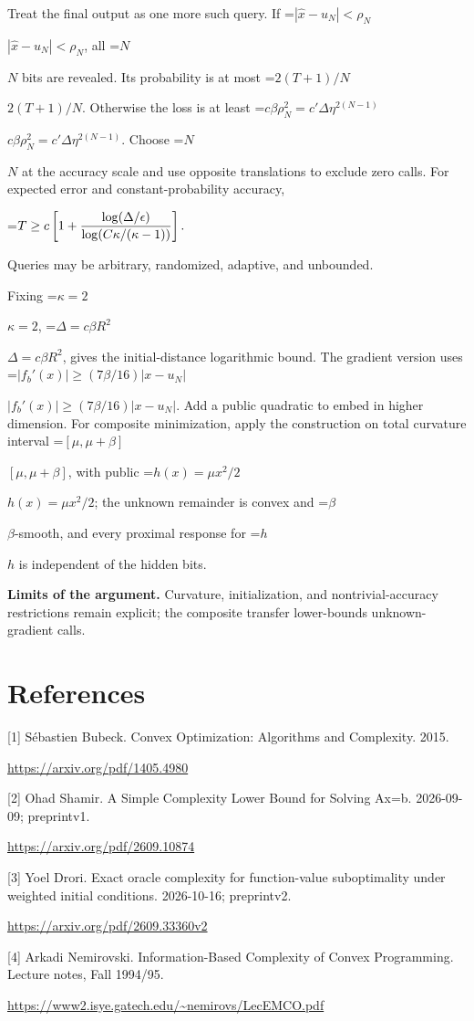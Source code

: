 \documentclass[10pt,a4paper]{article}
\newcommand{\AtlasMath}[1]{\par\begingroup\centering\setbox0=\hbox{$\displaystyle #1$}\ifdim\wd0>1.4\linewidth\typeout{ATLAS WIDE FORMULA: \the\wd0}\fi\ifdim\wd0>\linewidth\resizebox{\linewidth}{!}{\box0}\else\box0\fi\par\endgroup}
\newcommand{\AtlasInlineMath}[1]{\begingroup\setbox0=\hbox{$#1$}\ifdim\wd0>.4\linewidth\endgroup\AtlasMath{#1}\else\endgroup$#1$\fi}
\begin{document}
Treat the final output as one more such query. If \AtlasInlineMath{|\widehat x-u_N|<\rho_N}, all \AtlasInlineMath{N} bits are revealed. Its probability is at most \AtlasInlineMath{2(T+1)/N}. Otherwise the loss is at least
\AtlasInlineMath{c\beta\rho_N^2=c'\Delta\eta^{2(N-1)}}.
Choose \AtlasInlineMath{N} at the accuracy scale and use opposite translations to exclude zero calls. For expected error and constant-probability accuracy,

\AtlasMath{T\ge c\left[1+{\log(\Delta/\epsilon)\over
\log(C\kappa/(\kappa-1))}\right].}

Queries may be arbitrary, randomized, adaptive, and unbounded.

Fixing \AtlasInlineMath{\kappa=2}, \AtlasInlineMath{\Delta=c\beta R^2}, gives the initial-distance logarithmic bound. The gradient version uses
\AtlasInlineMath{|f_b'(x)|\ge(7\beta/16)|x-u_N|}.
Add a public quadratic to embed in higher dimension. For composite minimization, apply the construction on total curvature interval \AtlasInlineMath{[\mu,\mu+\beta]}, with public \AtlasInlineMath{h(x)=\mu x^2/2}; the unknown remainder is convex and \AtlasInlineMath{\beta}-smooth, and every proximal response for \AtlasInlineMath{h} is independent of the hidden bits.

\textbf{Limits of the argument.} Curvature, initialization, and nontrivial-accuracy restrictions remain explicit; the composite transfer lower-bounds unknown-gradient calls.

\section{References}
[1] Sébastien Bubeck. Convex Optimization: Algorithms and Complexity. 2015.

\url{https://arxiv.org/pdf/1405.4980}

[2] Ohad Shamir. A Simple Complexity Lower Bound for Solving Ax=b. 2026-09-09; preprintv1.

\url{https://arxiv.org/pdf/2609.10874}

[3] Yoel Drori. Exact oracle complexity for function-value suboptimality under weighted initial conditions. 2026-10-16; preprintv2.

\url{https://arxiv.org/pdf/2609.33360v2}

[4] Arkadi Nemirovski. Information-Based Complexity of Convex Programming. Lecture notes, Fall 1994/95.

\url{https://www2.isye.gatech.edu/~nemirovs/LecEMCO.pdf}
\end{document}
